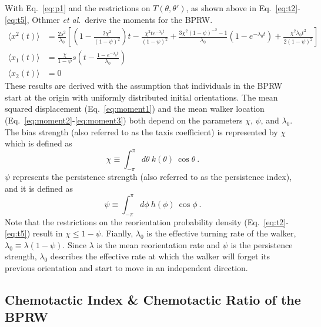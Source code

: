 With Eq.\ \ref{eq:p1} and the restrictions on $T(\theta,\theta')$, as shown above in Eq.\ \ref{eq:t2}-\ref{eq:t5}, Othmer \textit{et al}.\ derive the moments for the BPRW.
\begin{align} \label{eq:moment1}
    \langle x^2(t) \rangle &= \frac{2s^2}{\lambda_0} \left[ \left(1-\frac{2\chi^2}{(1-\psi)^2}\right)t
    - \frac{\chi^2 t e^{-\lambda_0 t}}{(1-\psi)^2}
    + \frac{3\chi^2(1-\psi)^{-2}-1}{\lambda_0} \left(1-e^{-\lambda_0 t}\right)
    + \frac{\chi^2 \lambda_0 t^2}{2(1-\psi)^2} \right] \\
    \langle x_1(t) \rangle &= \frac{\chi}{1-\psi} s \left(t -\frac{1-e^{-\lambda_0 t}}{\lambda_0} \right) \label{eq:moment2} \\
    \langle x_2(t) \rangle &= 0 \label{eq:moment3}
\end{align}
These results are derived with the assumption that individuals in the BPRW start at the origin with uniformly distributed initial orientations.
The mean squared displacement (Eq.\ \ref{eq:moment1}) and the mean walker location (Eq.\ \ref{eq:moment2}-\ref{eq:moment3}) both depend on the parameters $\chi$, $\psi$, and $\lambda_0$. The bias strength (also referred to as the taxis coefficient) is represented by $\chi$ which is defined as
\begin{equation} \label{eq:chi}
    \chi \equiv \int_{-\pi}^{\pi} d\theta \ k(\theta) \ \cos\theta \ .
\end{equation}
$\psi$ represents the persistence strength (also referred to as the persistence index), and it is defined as
\begin{equation} \label{eq:psi}
    \psi \equiv \int_{-\pi}^{\pi} d\phi \ h(\phi) \ \cos\phi \ .
\end{equation}
Note that the restrictions on the reorientation probability density (Eq.\ \ref{eq:t2}-\ref{eq:t5}) result in $\chi \leq 1 - \psi$. Fianlly, $\lambda_0$ is the effective turning rate of the walker,
$\lambda_0 \equiv \lambda(1-\psi)$.
Since $\lambda$ is the mean reorientation rate and $\psi$ is the persistence strength, $\lambda_0$ describes the effective rate at which the walker will forget its previous orientation and start to move in an independent direction.

\subsection{Chemotactic Index \& Chemotactic Ratio of the BPRW}

